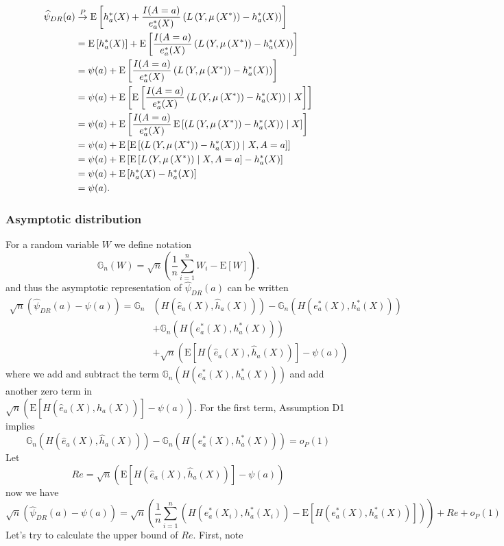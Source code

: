 $$
\begin{aligned}
\widehat{\psi}_{DR}(a) & \stackrel{P}{\rightarrow}  \operatorname{E}\left[h^*_a(X)+\frac{I(A = a)}{e^*_a(X)}\left(L\left(Y, \mu\left(X^*\right)\right)-h^*_a(X)\right)\right] \\
&= \operatorname{E}\left[h^*_a(X)\right]+\operatorname{E}\left[\frac{I(A = a)}{e^*_a(X)}\left(L\left(Y, \mu\left(X^*\right)\right)-h^*_a(X)\right)\right] \\
& =\psi(a)+\operatorname{E}\left[\frac{I(A = a)}{e^*_a(X)}\left(L\left(Y, \mu\left(X^*\right)\right)-h^*_a(X)\right)\right] \\
& =\psi(a)+\operatorname{E}\left[\operatorname{E}\left[\frac{I(A = a)}{e^*_a(X)}\left(L\left(Y, \mu\left(X^*\right)\right)-h^*_a(X)\right) \mid X \right]\right] \\
& =\psi(a)+\operatorname{E}\left[\frac{I(A = a)}{e^*_a(X)} \operatorname{E}\left[\left(L\left(Y, \mu\left(X^*\right)\right)-h^*_a(X)\right) \mid X \right]\right] \\
& =\psi(a)+\operatorname{E}\left[\operatorname{E}\left[\left(L\left(Y, \mu\left(X^*\right)\right)-h^*_a(X)\right) \mid X, A=a \right]\right] \\
& =\psi(a)+\operatorname{E}\left[\operatorname{E}\left[L\left(Y, \mu\left(X^*\right)\right) \mid X, A=a  \right] -h^*_a(X) \right] \\
& =\psi(a)+\operatorname{E}\left[h^*_a(X) -h^*_a(X) \right] \\
& =\psi(a) .
\end{aligned}
$$

\subsubsection{Asymptotic distribution}

For a random variable $W$ we define notation
$$
\mathbb{G}_n(W)=\sqrt{n}\left(\frac{1}{n} \sum_{i=1}^n W_i-\mathrm{E}[W]\right) .
$$
and thus the asymptotic representation of $\widehat{\psi}_{DR}(a)$ can be written
$$
\begin{aligned}
\sqrt{n}\left(\widehat{\psi}_{DR}(a)-\psi(a)\right)=\mathbb{G}_n &(H(\widehat{e}_a(X), \widehat{h}_a(X)))-\mathbb{G}_n\left(H\left(e^*_a(X), h^*_a(X)\right)\right) \\
& +\mathbb{G}_n\left(H\left(e^*_a(X), h^*_a(X)\right)\right) \\
& +\sqrt{n}(\mathrm{E}[H(\widehat{e}_a(X), \widehat{h}_a(X))]-\psi(a))
\end{aligned}
$$
where we add and subtract the term $\mathbb{G}_n\left(H\left(e^*_a(X), h^*_a(X)\right)\right)$ and add another zero term in \\$\sqrt{n}(\mathrm{E}[H(\widehat{e}_a(X), \widehat{h}_a(X))]-\psi(a))$. For the first term, Assumption D1 implies
$$
\mathbb{G}_n(H(\widehat{e}_a(X), \widehat{h}_a(X)))-\mathbb{G}_n\left(H\left(e^*_a(X), h^*_a(X)\right)\right)=o_P(1)
$$
Let 
$$
Re=\sqrt{n}(\mathrm{E}[H(\widehat{e}_a(X), \widehat{h}_a(X))]-\psi(a))
$$
now we have
$$
\sqrt{n}\left(\widehat{\psi}_{DR}(a)-\psi(a)\right)=\sqrt{n}\left(\frac{1}{n} \sum_{i=1}^n\left(H\left(e^*_a(X_i), h^*_a(X_i)\right)-\mathrm{E}\left[H\left(e^*_a(X), h^*_a(X)\right)\right]\right)\right)+R e+o_P(1)
$$
Let's try to calculate the upper bound of $Re$. First, note

